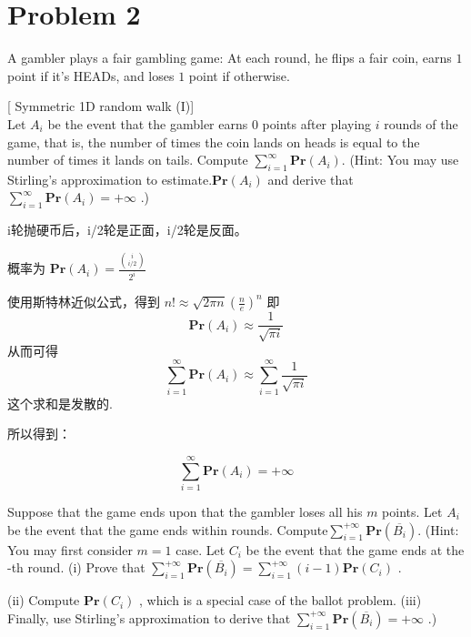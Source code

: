 \documentclass[12pt, a4paper, oneside]{ctexart}
\begin{document}
\section*{Problem 2}
A gambler plays a fair gambling game: At each round, he flips a fair coin, earns $1$ point if it's HEADs, and loses $1$ point if otherwise.
\begin{problem}

[ Symmetric 1D random walk (I)] \\
Let $A_i$ be the event that the gambler earns 0 points after playing $ i $ rounds of the game, that is, the number of times the coin lands on heads is equal to the number of times it lands on tails. Compute $\sum_{i=1}^\infty \mathbf{Pr} (A_i)$. (Hint: You may use Stirling’s approximation to estimate.$\mathbf{Pr} (A_i)$ and derive that$\sum_{i=1}^\infty \mathbf{Pr} (A_i) = +\infty$ .)
\end{problem}

\begin{solution}
  i轮抛硬币后，i/2轮是正面，i/2轮是反面。

  概率为
  $\mathbf{Pr} (A_i) = \frac{\binom{i}{i/2}}{2^i}$

  使用斯特林近似公式，得到 $n! \approx \sqrt{2\pi n}(\frac{n}{e})^n$
  即
  $$\mathbf{Pr} (A_i) \approx \frac{1}{\sqrt{\pi i}}$$
  从而可得
  $$\sum_{i=1}^\infty \mathbf{Pr} (A_i) \approx \sum_{i=1}^\infty \frac{1}{\sqrt{\pi i}}$$
  这个求和是发散的.

  所以得到：

  $$\sum_{i=1}^\infty \mathbf{Pr} (A_i) = +\infty$$
\end{solution}

\begin{problem}
 Suppose that the game ends upon that the gambler loses all his $m$
points. Let $A_i$
be the event that the game ends within
rounds. Compute$\displaystyle{ \sum_{i=1}^{+\infty} \mathbf{Pr}(\overline{B_i}) }$. (Hint: You may first consider $m=1$
case. Let $\displaystyle{C_i}$
be the event that the game ends at the
-th round. (i) Prove that $\displaystyle{ \sum_{i=1}^{+\infty} \mathbf{Pr}(\overline{B_i}) = \sum_{i=1}^{+\infty} (i-1) \mathbf{Pr}(C_i) }$
.

(ii) Compute $\displaystyle{ \mathbf{Pr}(C_i) }$
, which is a special case of the ballot problem. (iii) Finally, use Stirling's approximation to derive that $\displaystyle{ \sum_{i=1}^{+\infty} \mathbf{Pr}(\overline{B_i}) = +\infty }$
.)
\end{problem}
\end{document}
